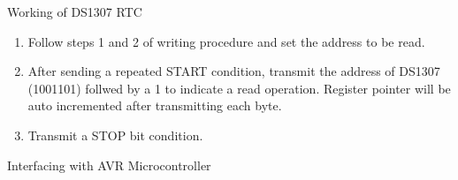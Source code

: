 \documentclass[11pt]{beamer}
\begin{document}
\begin{frame}[t,allowframebreaks]{Working of DS1307 RTC}
        \begin{enumerate}
            \item Follow steps 1 and 2 of writing procedure and set the address to be read.
            \item After sending a repeated START condition, transmit the address of DS1307 (1001101) follwed by a 1 to
            indicate a read operation. Register pointer will be auto incremented after transmitting each byte.
            \item Transmit a STOP bit condition.
        \end{enumerate}
    \end{frame}

    \begin{frame}{Interfacing with AVR Microcontroller}


\end{frame}
\end{document}
